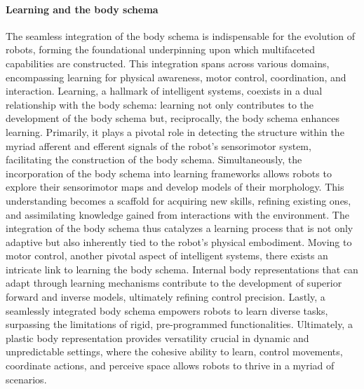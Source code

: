 \paragraph*{Learning and the body schema} The seamless integration of the body schema is indispensable for the evolution of robots, forming the foundational underpinning upon which multifaceted capabilities are constructed. This integration spans across various domains, encompassing learning for physical awareness, motor control, coordination, and interaction. Learning, a hallmark of intelligent systems, coexists in a dual relationship with the body schema: learning not only contributes to the development of the body schema but, reciprocally, the body schema enhances learning. Primarily, it plays a pivotal role in detecting the structure within the myriad afferent and efferent signals of the robot's sensorimotor system, facilitating the construction of the body schema. Simultaneously, the incorporation of the body schema into learning frameworks allows robots to explore their sensorimotor maps and develop models of their morphology. This understanding becomes a scaffold for acquiring new skills, refining existing ones, and assimilating knowledge gained from interactions with the environment. The integration of the body schema thus catalyzes a learning process that is not only adaptive but also inherently tied to the robot's physical embodiment. Moving to motor control, another pivotal aspect of intelligent systems, there exists an intricate link to learning the body schema. Internal body representations that can adapt through learning mechanisms contribute to the development of superior forward and inverse models, ultimately refining control precision. Lastly, a seamlessly integrated body schema empowers robots to learn diverse tasks, surpassing the limitations of rigid, pre-programmed functionalities. Ultimately, a plastic body representation provides versatility crucial in dynamic and unpredictable settings, where the cohesive ability to learn, control movements, coordinate actions, and perceive space allows robots to thrive in a myriad of scenarios.

